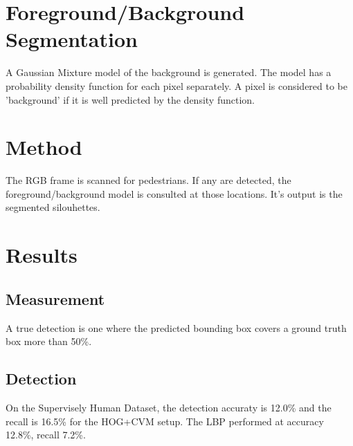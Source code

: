 \documentclass{article}
\begin{document}
\section{Foreground/Background Segmentation}
A Gaussian Mixture model of the background is generated\cite{knn_background_subt}.
The model has a probability density function for each pixel separately.
A pixel is considered to be 'background' if it is well predicted by the density function.


\section{Method}
The RGB frame is scanned for pedestrians.
If any are detected, the foreground/background model is consulted at those locations.
It's output is the segmented silouhettes.


\section{Results}
\subsection{Measurement}
A true detection is one where the predicted bounding box covers a ground truth box more than 50\%.

\subsection{Detection}
On the Supervisely Human Dataset, the detection accuraty is 12.0\% and the recall is 16.5\% for the HOG+CVM setup.
The LBP performed at accuracy 12.8\%, recall 7.2\%.
\end{document}
